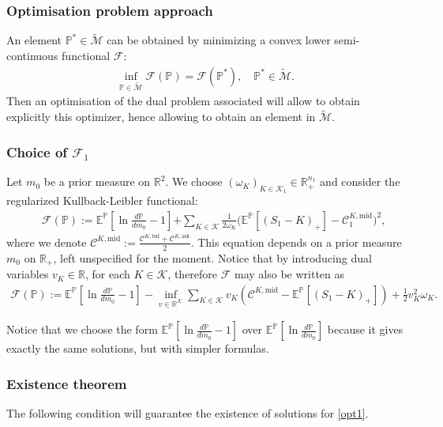 \documentclass{amsart}%
\def \R{\mathbb{R}}
\def\Cc{{\cal C}}
\def\Fc{{\cal F}}
\def\Kc{{\cal K}}
\def\no{\noindent}
\theoremstyle{definition}
\theoremstyle{remark}
\newcommand{\PP}{\mathbb{P}}
\newcommand{\bea}{\begin{eqnarray}}
\newcommand{\eea}{\end{eqnarray}}
\newcommand{\beaa}{\begin{eqnarray*}}
\newcommand{\eeaa}{\end{eqnarray*}}
\newcommand{\EE}{{\mathbb E}}
\newcommand{\RR}{{\mathbb R}}
\newcommand{\cal}{\mathcal}
\begin{document}
\subsubsection{Optimisation problem approach} An element $\PP^* \in \widetilde{\cal M}$ can be obtained by minimizing a convex lower semi-continuous functional ${\Fc}$:
\bea \label{opt1}
\inf_{\PP \in \widetilde{\cal M}} {\Fc}(\PP)={\Fc}(\PP^*), \quad \PP^* \in \widetilde{\cal M}.
\eea
Then an optimisation of the dual problem associated will allow to obtain explicitly this optimizer, hence allowing to obtain an element in $\widetilde{\cal M}$.

\subsubsection{Choice of $\Fc_1$} Let $m_0$ be a prior measure on $\R^2$. We choose $(\omega_K)_{K \in {\cal K}_1} \in \RR^{n_1}_+$ and consider the regularized Kullback-Leibler functional:
\beaa
&&
{\Fc}(\PP):=  \EE^{\PP}\left[  \ln \frac{d\PP }{d{m_0}}-1\right] {+\sum_{K \in \Kc} \frac{1 }{2 \omega_K}\big(\EE^\PP[(S_1-K)_+]-\Cc^{K,\mathrm{mid}}_1\big)^2 },
\eeaa
where we denote $\Cc^{K,\mathrm{mid}}:= \frac{\Cc^{K,\mathrm{bid}}+\Cc^{K,\mathrm{ask}}}{2}$. This equation depends on a prior measure ${m_0}$ on $\RR_+$, left unspecified for the moment. Notice that by introducing dual variables $v_K \in \RR$, for each $K \in {\cal K}$, therefore ${\Fc}$ may also be written as
\beaa
{\Fc}
(\PP):=\EE^{\PP}\left[ \ln \frac{d\PP }{d{m_0}}-1\right] -{\inf_{v \in \RR^{{\cal K}}} \sum_{K \in {\cal K}} v_K\left(\Cc^{K,\mathrm{mid}}- \EE^\PP[(S_1-K)_+]\right)+ \frac{1 }{2}v_K^2 \omega_K }.
\eeaa

\no Notice that we choose the form $\EE^{\PP}\left[ \ln \frac{d\PP }{d{m_0}}-1\right]$ over $\EE^{\PP}\left[ \ln \frac{d\PP }{d{m_0}}\right]$ because it gives exactly the same solutions, but with simpler formulas.

\subsubsection{Existence theorem}

\no The following condition will guarantee the existence of solutions for \ref{opt1}.
\end{document}
